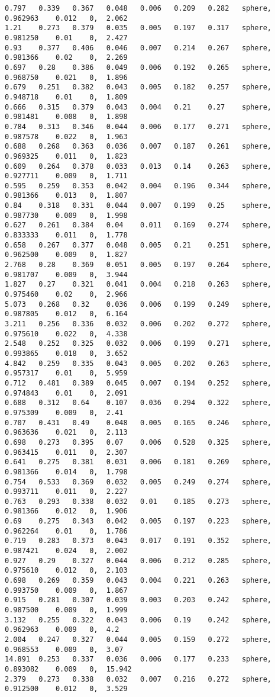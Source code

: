 {\begin{lstlisting}[caption={Datos obtenidos para la prueba de la esfera usando AE.}]
0.797	0.339	0.367	0.048	0.006	0.209	0.282	sphere, 	0.962963	0.012	0, 	2.062
1.21	0.273	0.379	0.035	0.005	0.197	0.317	sphere, 	0.981250	0.01	0, 	2.427
0.93	0.377	0.406	0.046	0.007	0.214	0.267	sphere, 	0.981366	0.02	0, 	2.269
0.697	0.28	0.386	0.049	0.006	0.192	0.265	sphere, 	0.968750	0.021	0, 	1.896
0.679	0.251	0.382	0.043	0.005	0.182	0.257	sphere, 	0.948718	0.01	0, 	1.809
0.666	0.315	0.379	0.043	0.004	0.21	0.27	sphere, 	0.981481	0.008	0, 	1.898
0.784	0.313	0.346	0.044	0.006	0.177	0.271	sphere, 	0.987578	0.022	0, 	1.963
0.688	0.268	0.363	0.036	0.007	0.187	0.261	sphere, 	0.969325	0.011	0, 	1.823
0.609	0.264	0.378	0.033	0.013	0.14	0.263	sphere, 	0.927711	0.009	0, 	1.711
0.595	0.259	0.353	0.042	0.004	0.196	0.344	sphere, 	0.981366	0.013	0, 	1.807
0.84	0.318	0.331	0.044	0.007	0.199	0.25	sphere, 	0.987730	0.009	0, 	1.998
0.627	0.261	0.384	0.04	0.011	0.169	0.274	sphere, 	0.833333	0.011	0, 	1.778
0.658	0.267	0.377	0.048	0.005	0.21	0.251	sphere, 	0.962500	0.009	0, 	1.827
2.768	0.28	0.369	0.051	0.005	0.197	0.264	sphere, 	0.981707	0.009	0, 	3.944
1.827	0.27	0.321	0.041	0.004	0.218	0.263	sphere, 	0.975460	0.02	0, 	2.966
5.073	0.268	0.32	0.036	0.006	0.199	0.249	sphere, 	0.987805	0.012	0, 	6.164
3.211	0.256	0.336	0.032	0.006	0.202	0.272	sphere, 	0.975610	0.022	0, 	4.338
2.548	0.252	0.325	0.032	0.006	0.199	0.271	sphere, 	0.993865	0.018	0, 	3.652
4.842	0.259	0.335	0.043	0.005	0.202	0.263	sphere, 	0.957317	0.01	0, 	5.959
0.712	0.481	0.389	0.045	0.007	0.194	0.252	sphere, 	0.974843	0.01	0, 	2.091
0.688	0.312	0.64	0.107	0.036	0.294	0.322	sphere, 	0.975309	0.009	0, 	2.41
0.707	0.431	0.49	0.048	0.005	0.165	0.246	sphere, 	0.963636	0.021	0, 	2.113
0.698	0.273	0.395	0.07	0.006	0.528	0.325	sphere, 	0.963415	0.011	0, 	2.307
0.641	0.275	0.381	0.031	0.006	0.181	0.269	sphere, 	0.981366	0.014	0, 	1.798
0.754	0.533	0.369	0.032	0.005	0.249	0.274	sphere, 	0.993711	0.011	0, 	2.227
0.763	0.293	0.338	0.032	0.01	0.185	0.273	sphere, 	0.981366	0.012	0, 	1.906
0.69	0.275	0.343	0.042	0.005	0.197	0.223	sphere, 	0.962264	0.01	0, 	1.786
0.719	0.283	0.373	0.043	0.017	0.191	0.352	sphere, 	0.987421	0.024	0, 	2.002
0.927	0.29	0.327	0.044	0.006	0.212	0.285	sphere, 	0.975610	0.012	0, 	2.103
0.698	0.269	0.359	0.043	0.004	0.221	0.263	sphere, 	0.993750	0.009	0, 	1.867
0.915	0.281	0.307	0.039	0.003	0.203	0.242	sphere, 	0.987500	0.009	0, 	1.999
3.132	0.255	0.322	0.043	0.006	0.19	0.242	sphere, 	0.962963	0.009	0, 	4.2
2.004	0.247	0.327	0.044	0.005	0.159	0.272	sphere, 	0.968553	0.009	0, 	3.07
14.891	0.253	0.337	0.036	0.006	0.177	0.233	sphere, 	0.893082	0.009	0, 	15.942
2.379	0.273	0.338	0.032	0.007	0.216	0.272	sphere, 	0.912500	0.012	0, 	3.529

\end{lstlisting}}
